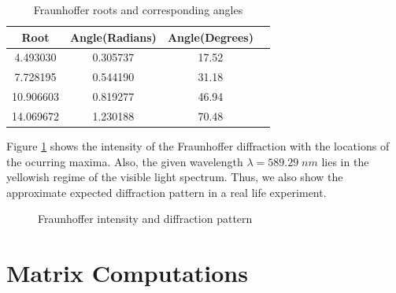 \documentclass{article}
\begin{document}
\begin{table}[H]
  \begin{center}
    \begin{tabular}{|c|c|c|c|}
      \hline
      Root & Angle(Radians) & Angle(Degrees) \\
      \hline
      4.493030 & 0.305737 & 17.52 \\
      \hline
      7.728195 & 0.544190 & 31.18 \\
      \hline
      10.906603 & 0.819277 & 46.94 \\
      \hline
      14.069672 & 1.230188 & 70.48 \\
      \hline
    \end{tabular}
  \end{center}
  \caption {Fraunhoffer roots and corresponding angles}
  \label{tab:fraun_roots}
\end{table}

Figure \ref{fig:fraun_int} shows the intensity of the Fraunhoffer diffraction with the locations of the ocurring maxima. Also, the given wavelength $\lambda = 589.29\;nm$
lies in the yellowish regime of the visible light spectrum. Thus, we also show the approximate expected diffraction pattern in a real life experiment.

\begin{figure}[H]
  \begin{center}
  \end{center}
  \caption{Fraunhoffer intensity and diffraction pattern}
  \label{fig:fraun_int}
\end{figure}


\section{Matrix Computations}
\end{document}
